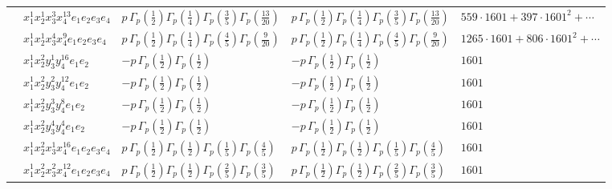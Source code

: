 \documentclass[11pt]{article}
\begin{document}
\begin{table}[ht]
{\begin{tabular}{@{}lllll@{}}
 & $x_{1}^{1} x_{2}^{1} x_{3}^{3} x_{4}^{13}  e_{1} e_{2} e_{3} e_{4}$ & $p \, \Gamma_p \left( \frac{1}{2} \right) \Gamma_p \left( \frac{1}{4} \right) \Gamma_p \left( \frac{3}{5} \right) \Gamma_p \left( \frac{13}{20} \right)$ & $p \, \Gamma_p \left( \frac{1}{2} \right) \Gamma_p \left( \frac{1}{4} \right) \Gamma_p \left( \frac{3}{5} \right) \Gamma_p \left( \frac{13}{20} \right)$ & $559{\cdot}1601{+}397{\cdot}1601^{2}{+}\cdots$ \\
 & $x_{1}^{1} x_{2}^{1} x_{3}^{4} x_{4}^{9}  e_{1} e_{2} e_{3} e_{4}$ & $p \, \Gamma_p \left( \frac{1}{2} \right) \Gamma_p \left( \frac{1}{4} \right) \Gamma_p \left( \frac{4}{5} \right) \Gamma_p \left( \frac{9}{20} \right)$ & $p \, \Gamma_p \left( \frac{1}{2} \right) \Gamma_p \left( \frac{1}{4} \right) \Gamma_p \left( \frac{4}{5} \right) \Gamma_p \left( \frac{9}{20} \right)$ & $1265{\cdot}1601{+}806{\cdot}1601^{2}{+}\cdots$ \\
 & $x_{1}^{1} x_{2}^{2} y_{3}^{1} y_{4}^{16} e_{1} e_{2}$ & $- p \, \Gamma_p \left( \frac{1}{2} \right) \Gamma_p \left( \frac{1}{2} \right)$ & $- p \, \Gamma_p \left( \frac{1}{2} \right) \Gamma_p \left( \frac{1}{2} \right)$ & $1601$ \\
 & $x_{1}^{1} x_{2}^{2} y_{3}^{2} y_{4}^{12} e_{1} e_{2}$ & $- p \, \Gamma_p \left( \frac{1}{2} \right) \Gamma_p \left( \frac{1}{2} \right)$ & $- p \, \Gamma_p \left( \frac{1}{2} \right) \Gamma_p \left( \frac{1}{2} \right)$ & $1601$ \\
 & $x_{1}^{1} x_{2}^{2} y_{3}^{3} y_{4}^{8} e_{1} e_{2}$ & $- p \, \Gamma_p \left( \frac{1}{2} \right) \Gamma_p \left( \frac{1}{2} \right)$ & $- p \, \Gamma_p \left( \frac{1}{2} \right) \Gamma_p \left( \frac{1}{2} \right)$ & $1601$ \\
 & $x_{1}^{1} x_{2}^{2} y_{3}^{4} y_{4}^{4} e_{1} e_{2}$ & $- p \, \Gamma_p \left( \frac{1}{2} \right) \Gamma_p \left( \frac{1}{2} \right)$ & $- p \, \Gamma_p \left( \frac{1}{2} \right) \Gamma_p \left( \frac{1}{2} \right)$ & $1601$ \\
 & $x_{1}^{1} x_{2}^{2} x_{3}^{1} x_{4}^{16}  e_{1} e_{2} e_{3} e_{4}$ & $p \, \Gamma_p \left( \frac{1}{2} \right) \Gamma_p \left( \frac{1}{2} \right) \Gamma_p \left( \frac{1}{5} \right) \Gamma_p \left( \frac{4}{5} \right)$ & $p \, \Gamma_p \left( \frac{1}{2} \right) \Gamma_p \left( \frac{1}{2} \right) \Gamma_p \left( \frac{1}{5} \right) \Gamma_p \left( \frac{4}{5} \right)$ & $1601$ \\
 & $x_{1}^{1} x_{2}^{2} x_{3}^{2} x_{4}^{12}  e_{1} e_{2} e_{3} e_{4}$ & $p \, \Gamma_p \left( \frac{1}{2} \right) \Gamma_p \left( \frac{1}{2} \right) \Gamma_p \left( \frac{2}{5} \right) \Gamma_p \left( \frac{3}{5} \right)$ & $p \, \Gamma_p \left( \frac{1}{2} \right) \Gamma_p \left( \frac{1}{2} \right) \Gamma_p \left( \frac{2}{5} \right) \Gamma_p \left( \frac{3}{5} \right)$ & $1601$ \\

\end{tabular}}
\end{table}
\end{document}
